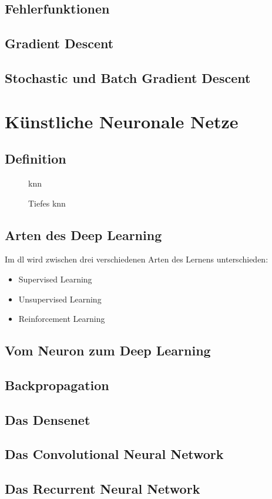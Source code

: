 \documentclass[conference, german]{IEEEtran}
\begin{document}
\subsection{Fehlerfunktionen}
\subsection{Gradient Descent}
\subsection{Stochastic und Batch Gradient Descent}
\section{Künstliche Neuronale Netze}
\subsection{Definition}
\begin{figure}[H]
	
	\caption{\ac{knn}}
	\label{fig:not-hidden}
\end{figure}

\begin{figure}[H]
	
	\caption{Tiefes \ac{knn}}
	\label{fig:hidden}
\end{figure}
\subsection{Arten des Deep Learning}
Im \ac{dl} wird zwischen drei verschiedenen Arten des Lernens unterschieden:
\begin{itemize}
	\item Supervised Learning
	\item Unsupervised Learning
	\item Reinforcement Learning
\end{itemize}
\subsection{Vom Neuron zum Deep Learning}



\subsection{Backpropagation}
\subsection{Das Densenet}
\subsection{Das Convolutional Neural Network}
\subsection{Das Recurrent Neural Network}

\printbibliography
\end{document}
